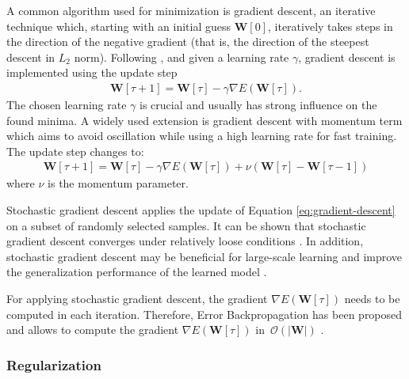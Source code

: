 A common algorithm used for minimization is gradient descent, an iterative technique which, starting with an initial guess $\mathbf{W}[0]$, iteratively takes steps in the direction of the negative gradient (that is, the direction of the steepest descent in $L_2$ norm). Following \cite{Bottou:2012}, and given a learning rate $\gamma$, gradient descent is implemented using the update step
\begin{align}
    \mathbf{W}[\tau + 1] = \mathbf{W}[\tau] - \gamma \nabla E\left(\mathbf{W}[\tau]\right)\label{eq:gradient-descent}.
\end{align}
The chosen learning rate $\gamma$ is crucial and usually has strong influence on the found minima. A widely used extension is gradient descent with momentum term which aims to avoid oscillation while using a high learning rate for fast training. The update step changes to:
\begin{align}
    \mathbf{W}[\tau + 1] = \mathbf{W}[\tau] - \gamma \nabla E\left(\mathbf{W}[\tau]\right) + \nu(\mathbf{W}[\tau] - \mathbf{W}[\tau - 1])
\end{align}
where $\nu$ is the momentum parameter.

Stochastic gradient descent applies the update of Equation \eqref{eq:gradient-descent} on a subset of randomly selected samples. It can be shown that stochastic gradient descent converges under relatively loose conditions \cite{Bottou:2012}. In addition, stochastic gradient descent may be beneficial for large-scale learning \cite{Bottou:2012} and improve the generalization performance of the learned model \cite{BottouBousquet:2007}. 

For applying stochastic gradient descent, the gradient $\nabla E(\mathbf{W}[\tau])$ needs to be computed in each iteration. Therefore, Error Backpropagation has been proposed and allows to compute the gradient $\nabla E(\mathbf{W}[\tau])$ in~$\mathcal{O}\left(|\mathbf{W}|\right)$ \cite{Bishop:1995}.


\subsubsection{Regularization}
\label{subsubsec:regularization}


